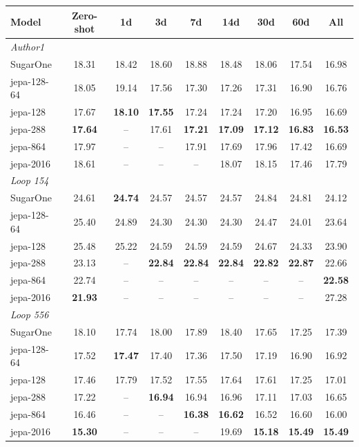 \documentclass[11pt,a4paper]{article}
\begin{document}
\begin{tabular}{lcccccccc}
  \hline
  Model & Zero-shot & 1d & 3d & 7d & 14d & 30d & 60d & All \\
  \hline
  \multicolumn{9}{l}{\textit{Author1}} \\
  SugarOne & 18.31 & 18.42 & 18.60 & 18.88 & 18.48 & 18.06 & 17.54 & 16.98 \\
  jepa-128-64 & 18.05 & 19.14 & 17.56 & 17.30 & 17.26 & 17.31 & 16.90 & 16.76 \\
  jepa-128 & 17.67 & \textbf{18.10} & \textbf{17.55} & 17.24 & 17.24 & 17.20 & 16.95 & 16.69 \\
  jepa-288 & \textbf{17.64} & -- & 17.61 & \textbf{17.21} & \textbf{17.09} & \textbf{17.12} & \textbf{16.83} & \textbf{16.53} \\
  jepa-864 & 17.97 & -- & -- & 17.91 & 17.69 & 17.96 & 17.42 & 16.69 \\
  jepa-2016 & 18.61 & -- & -- & -- & 18.07 & 18.15 & 17.46 & 17.79 \\
  \hline
  \multicolumn{9}{l}{\textit{Loop 154}} \\
  SugarOne & 24.61 & \textbf{24.74} & 24.57 & 24.57 & 24.57 & 24.84 & 24.81 & 24.12 \\
  jepa-128-64 & 25.40 & 24.89 & 24.30 & 24.30 & 24.30 & 24.47 & 24.01 & 23.64 \\
  jepa-128 & 25.48 & 25.22 & 24.59 & 24.59 & 24.59 & 24.67 & 24.33 & 23.90 \\
  jepa-288 & 23.13 & -- & \textbf{22.84} & \textbf{22.84} & \textbf{22.84} & \textbf{22.82} & \textbf{22.87} & 22.66 \\
  jepa-864 & 22.74 & -- & -- & -- & -- & -- & -- & \textbf{22.58} \\
  jepa-2016 & \textbf{21.93} & -- & -- & -- & -- & -- & -- & 27.28 \\
  \hline
  \multicolumn{9}{l}{\textit{Loop 556}} \\
  SugarOne & 18.10 & 17.74 & 18.00 & 17.89 & 18.40 & 17.65 & 17.25 & 17.39 \\
  jepa-128-64 & 17.52 & \textbf{17.47} & 17.40 & 17.36 & 17.50 & 17.19 & 16.90 & 16.92 \\
  jepa-128 & 17.46 & 17.79 & 17.52 & 17.55 & 17.64 & 17.61 & 17.25 & 17.01 \\
  jepa-288 & 17.22 & -- & \textbf{16.94} & 16.94 & 16.96 & 17.11 & 17.03 & 16.65 \\
  jepa-864 & 16.46 & -- & -- & \textbf{16.38} & \textbf{16.62} & 16.52 & 16.60 & 16.00 \\
  jepa-2016 & \textbf{15.30} & -- & -- & -- & 19.69 & \textbf{15.18} & \textbf{15.49} & \textbf{15.49} \\

\end{tabular}
\end{document}
